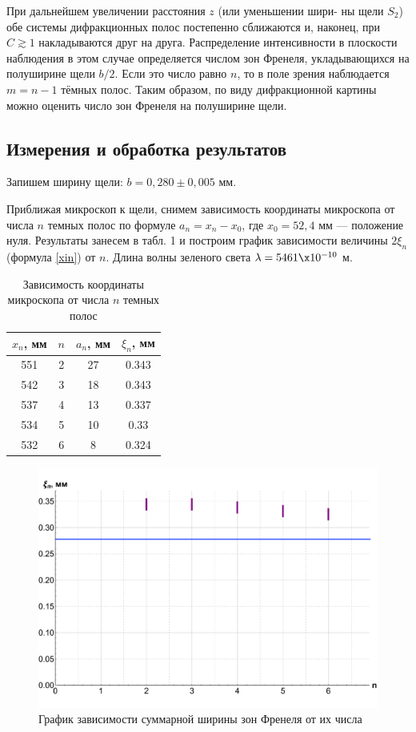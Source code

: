 \documentclass[12pt]{kiarticle} %
\begin{document}
При дальнейшем увеличении расстояния $ z $ (или уменьшении шири-
ны щели $ S_2 $) обе системы дифракционных полос постепенно сближаются и, наконец, при $ C \gtrsim 1 $ накладываются друг на друга. Распределение интенсивности в плоскости наблюдения в этом случае определяется
числом зон Френеля, укладывающихся на полуширине щели $ b/2 $. Если это число равно $ n $, то в поле зрения наблюдается $ m = n - 1 $ тёмных полос. Таким образом, по виду дифракционной картины можно оценить
число зон Френеля на полуширине щели.

\subsection{Измерения и обработка результатов}

Запишем ширину щели: $ b = 0,280 \pm 0,005 $ мм. 

Приближая микроскоп к щели, снимем зависимость координаты микроскопа от числа $ n $ темных полос по формуле $ a_n = x_n - x_0 $, где $ x_0 = 52,4 $ мм --- положение нуля. Результаты занесем в табл. 1 и построим график зависимости величины $ 2\xi_n $ (формула \eqref{xin}) от $ n $. Длина волны зеленого света $ \lambda = 5461 \x 10^{-10} $ м. 

\begin{table}[h!]
\caption{Зависимость координаты микроскопа от числа $ n $ темных полос}
\begin{center}
	\begin{tabular}{|c|c|c|c|}
		\hline
		$ x_n $, мм & $ n $ & $ a_n $, мм & $ \xi_n $, мм\\
		\hline
		551 & 2 & 27 & 0.343 \\
		542 & 3 & 18 & 0.343 \\
		537 & 4 & 13 & 0.337 \\
		534 & 5 & 10 & 0.33 \\
		532 & 6 & 8 & 0.324 \\
		\hline
	\end{tabular}
\end{center}
\label{}
\end{table}

	\begin{figure}[h!]
	\label{graf_a}
	\includegraphics[scale=0.47]{gr_a.pdf}
	\caption{График зависимости суммарной ширины зон Френеля от их числа}
\end{figure}
\end{document}
